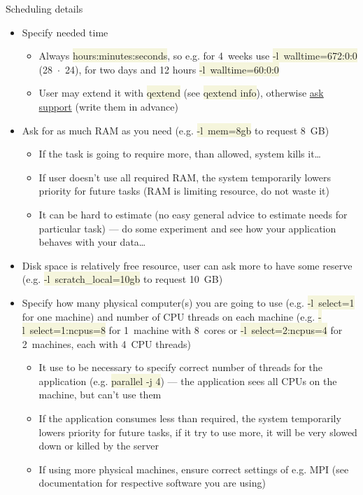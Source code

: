 \documentclass[compress, xelatex, 11pt, xcolor=svgnames, aspectratio=169, url={hyphens, lowtilde}]{beamer}
\renewcommand{\texttt}[1]{\colorbox{Beige}{{\ttfamily #1}}}
\begin{document}
\begin{frame}[allowframebreaks]{Scheduling details}
	\begin{itemize}
		\item Specify needed time
		\begin{itemize}
			\item Always \texttt{hours:minutes:seconds}, so e.g. for 4~weeks use \texttt{-l~walltime=672:0:0} (28~$\cdot$~24), for two days and 12 hours \texttt{-l~walltime=60:0:0}
			\item User may extend it with \texttt{qextend} (see \texttt{qextend info}), otherwise \href{mailto:meta@cesnet.cz}{ask support} (write them in advance)
		\end{itemize}
		\item Ask for as much RAM as you need (e.g. \texttt{-l~mem=8gb} to request 8~GB)
		\begin{itemize}
			\item If the task is going to require more, than allowed, system kills it\ldots
			\item If user doesn't use all required RAM, the system temporarily lowers priority for future tasks (RAM is limiting resource, do not waste it)
			\item It can be hard to estimate (no easy general advice to estimate needs for particular task) --- do some experiment and see how your application behaves with your data\ldots
		\end{itemize}
		\item Disk space is relatively free resource, user can ask more to have some reserve (e.g. \texttt{-l~scratch\_local=10gb} to request 10~GB)
		\item Specify how many physical computer(s) you are going to use (e.g. \texttt{-l~select=1} for one machine) and number of CPU threads on each machine (e.g. \texttt{-l~select=1:ncpus=8} for 1~machine with 8~cores or \texttt{-l~select=2:ncpus=4} for 2~machines, each with 4~CPU threads)
		\begin{itemize}
			\item It use to be necessary to specify correct number of threads for the application (e.g. \texttt{parallel -j 4}) --- the application sees all CPUs on the machine, but can't use them
			\item If the application consumes less than required, the system temporarily lowers priority for future tasks, if it try to use more, it will be very slowed down or killed by the server
			\item If using more physical machines, ensure correct settings of e.g. MPI (see documentation for respective software you are using)

\end{itemize}
\end{itemize}
\end{frame}
\end{document}

